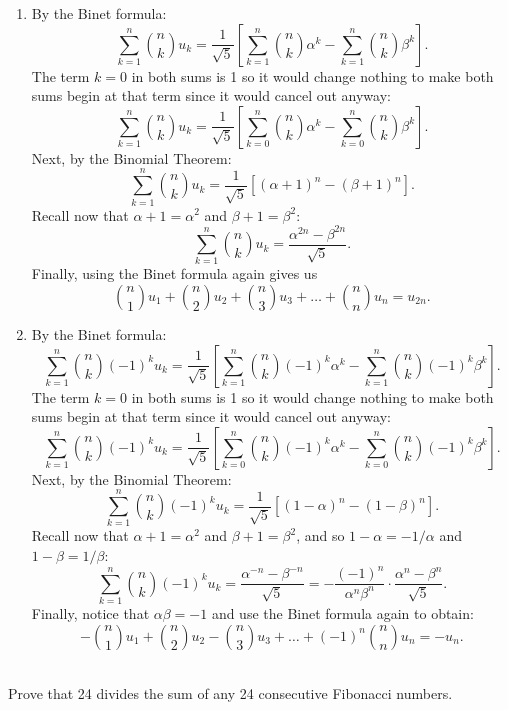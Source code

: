 \begin{solution}
    \begin{enumerate}
        \item By the Binet formula:
        $$\sum_{k=1}^{n}\binom{n}{k}u_k = \frac{1}{\sqrt{5}}\left[\sum_{k=1}^{n}\binom{n}{k}\alpha^k - \sum_{k=1}^{n}\binom{n}{k}\beta^k\right].$$
        The term $k = 0$ in both sums is 1 so it would change nothing to make both sums begin at that term since it would cancel out anyway:
        $$\sum_{k=1}^{n}\binom{n}{k}u_k = \frac{1}{\sqrt{5}}\left[\sum_{k=0}^{n}\binom{n}{k}\alpha^k - \sum_{k=0}^{n}\binom{n}{k}\beta^k\right].$$
        Next, by the Binomial Theorem:
        $$\sum_{k=1}^{n}\binom{n}{k}u_k = \frac{1}{\sqrt{5}}\left[(\alpha + 1)^n - (\beta + 1)^n\right].$$
        Recall now that $\alpha + 1 = \alpha^2$ and $\beta + 1 = \beta^2$:
        $$\sum_{k=1}^{n}\binom{n}{k}u_k = \frac{\alpha^{2n} - \beta^{2n}}{\sqrt{5}}.$$
        Finally, using the Binet formula again gives us 
        $$\binom{n}{1}u_1 + \binom{n}{2}u_2 + \binom{n}{3}u_3 + \dots + \binom{n}{n}u_n = u_{2n}.$$
        \item By the Binet formula:
        $$\sum_{k=1}^{n}\binom{n}{k}(-1)^ku_k = \frac{1}{\sqrt{5}}\left[\sum_{k=1}^{n}\binom{n}{k}(-1)^k\alpha^k - \sum_{k=1}^{n}\binom{n}{k}(-1)^k\beta^k\right].$$
        The term $k = 0$ in both sums is 1 so it would change nothing to make both sums begin at that term since it would cancel out anyway:
        $$\sum_{k=1}^{n}\binom{n}{k}(-1)^ku_k = \frac{1}{\sqrt{5}}\left[\sum_{k=0}^{n}\binom{n}{k}(-1)^k\alpha^k - \sum_{k=0}^{n}\binom{n}{k}(-1)^k\beta^k\right].$$
        Next, by the Binomial Theorem:
        $$\sum_{k=1}^{n}\binom{n}{k}(-1)^ku_k = \frac{1}{\sqrt{5}}\left[(1 - \alpha)^n - (1 - \beta)^n\right].$$
        Recall now that $\alpha + 1 = \alpha^2$ and $\beta + 1 = \beta^2$, and so $1 - \alpha = -1/\alpha$ and $1 - \beta = 1/\beta$:
        $$\sum_{k=1}^{n}\binom{n}{k}(-1)^ku_k = \frac{\alpha^{-n} - \beta^{-n}}{\sqrt{5}} = -\frac{(-1)^n}{\alpha^n\beta^n}\cdot\frac{\alpha^n - \beta^n}{\sqrt{5}}.$$
        Finally, notice that $\alpha\beta = -1$ and use the Binet formula again to obtain:
        $$-\binom{n}{1}u_1 + \binom{n}{2}u_2 - \binom{n}{3}u_3 + \dots + (-1)^n\binom{n}{n}u_n = -u_n.$$ \\
    \end{enumerate}
\end{solution}

\begin{exercise}
    Prove that 24 divides the sum of any 24 consecutive Fibonacci numbers. $$
\end{exercise}

